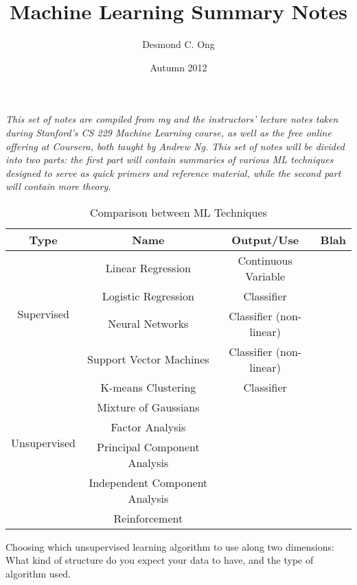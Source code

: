 \documentclass[letterpaper,10pt]{article}
\begin{document}
\author{Desmond C. Ong}
\title{Machine Learning Summary Notes}
\date{Autumn 2012}
\maketitle
\textit{This set of notes are compiled from my and the instructors' lecture notes taken during Stanford's CS 229 Machine Learning course, as well as the free online offering at Coursera, both taught by Andrew Ng. This set of notes will be divided into two parts: the first part will contain summaries of various ML techniques designed to serve as quick primers and reference material, while the second part will contain more theory.}

\tableofcontents

\newpage

\begin{table}[hbtp]
\center
\begin{tabular}{c|c|c|c}
Type & Name & Output/Use & Blah \\
\hline
\multirow{4}{*}{Supervised} & Linear Regression & Continuous Variable & \\
& Logistic Regression & Classifier & \\
& Neural Networks & Classifier (non-linear) & \\
& Support Vector Machines & Classifier (non-linear) & \\
\hline
\multirow{5}{*}{Unsupervised} & K-means Clustering & Classifier & \\
& Mixture of Gaussians  & & \\
& Factor Analysis & & \\
& Principal Component Analysis & & \\
& Independent Component Analysis  & & \\
\hline
& Reinforcement & & \\
\end{tabular}
\caption{Comparison between ML Techniques} \label{SummaryTable}
\end{table}


Choosing which unsupervised learning algorithm to use along two dimensions: What kind of structure do you expect your data to have, and the type of algorithm used.
\end{document}
